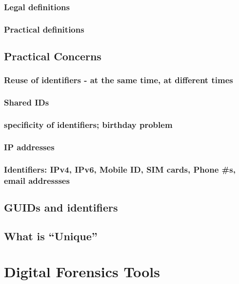 
\subsubsection{Legal definitions}


\subsubsection{Practical definitions}


\subsection{Practical Concerns}


\subsubsection{Reuse of identifiers - at the same time, at different times}
\subsubsection{Shared IDs}
\subsubsection{specificity of identifiers; birthday problem}
\subsubsection{IP addresses}
\subsubsection{Identifiers: IPv4, IPv6, Mobile ID, SIM cards, Phone \#s, email addressses}
\subsection{GUIDs and identifiers}
\subsection{What is ``Unique''}

\section{Digital Forensics Tools}

